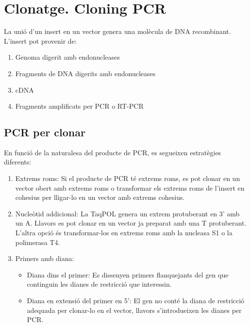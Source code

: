 \section{Clonatge. Cloning PCR}
\label{sec:clon-clon-pcr}

La unió d'un insert en un vector genera una molècula de DNA recombinant. L'insert pot provenir de:
\begin{enumerate}
\item Genoma digerit amb endonucleases
\item Fragments de DNA digerits amb endonucleases
\item cDNA
\item Fragments amplificats per PCR o RT-PCR
\end{enumerate}

\subsection{PCR per clonar}
\label{sec:pcr-per-clonar}

En funció de la naturalesa del producte de PCR, es segueixen estratègies diferents:
\begin{enumerate}
\item Extrems roms: Si el producte de PCR té extrems roms, es pot clonar en un vector obert amb extrems roms o transformar els extrems roms de l'insert en cohesius per lligar-lo en un vector amb extrems cohesius.

\item Nucleòtid addicional: La TaqPOL genera un extrem protuberant en 3' amb un A. Llavors es pot clonar en un vector ja preparat amb una T protuberant. L'altra opció és transformar-los en extrems roms amb la nucleasa S1 o la polimerasa T4.

\item Primers amb diana: 
  \begin{itemize}
  \item Diana dins el primer: Es dissenyen primers flanquejants del gen que continguin les dianes de restricció que interessin.
  \item Diana en extensió del primer en 5': El gen no conté la diana de restricció adequada per clonar-lo en el vector, llavors s'introdueixen les dianes per PCR.
  \end{itemize}
\end{enumerate}


